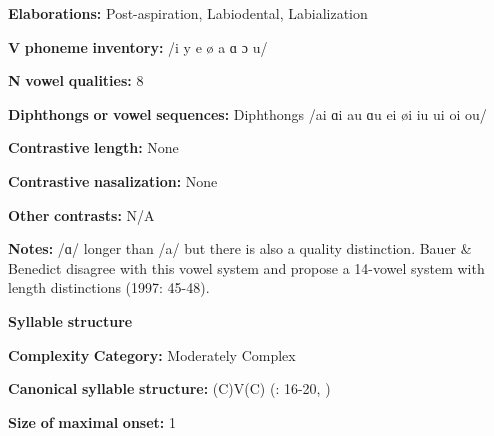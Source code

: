\documentclass[output=paper]{langsci/langscibook}
\begin{document}
\begin{styleBody}
\textbf{Elaborations:} Post-aspiration, Labiodental, Labialization
\end{styleBody}

\begin{styleBody}
\textbf{V} \textbf{phoneme} \textbf{inventory:} /i y e ø a ɑ ɔ u/
\end{styleBody}

\begin{styleBody}
\textbf{N} \textbf{vowel} \textbf{qualities:} 8
\end{styleBody}

\begin{styleBody}
\textbf{Diphthongs} \textbf{or} \textbf{vowel} \textbf{sequences:} Diphthongs /ai ɑi au ɑu ei øi iu ui oi ou/
\end{styleBody}

\begin{styleBody}
\textbf{Contrastive} \textbf{length:} None
\end{styleBody}

\begin{styleBody}
\textbf{Contrastive} \textbf{nasalization:} None
\end{styleBody}

\begin{styleBody}
\textbf{Other} \textbf{contrasts:} N/A
\end{styleBody}

\begin{styleBody}
\textbf{Notes:} /ɑ/ longer than /a/ but there is also a quality distinction. Bauer \& Benedict disagree with this vowel system and propose a 14-vowel system with length distinctions (1997: 45-48).
\end{styleBody}

\begin{styleBody}
\textbf{Syllable} \textbf{structure}
\end{styleBody}

\begin{styleBody}
\textbf{Complexity} \textbf{Category:} Moderately Complex
\end{styleBody}

\begin{styleBody}
\textbf{Canonical} \textbf{syllable} \textbf{structure:} (C)V(C) (\citealt{MatthewsYip1994}: 16-20, \citealt{BauerBenedict1997})
\end{styleBody}

\begin{styleBody}
\textbf{Size} \textbf{of} \textbf{maximal} \textbf{onset:} 1
\end{styleBody}
\end{document}
